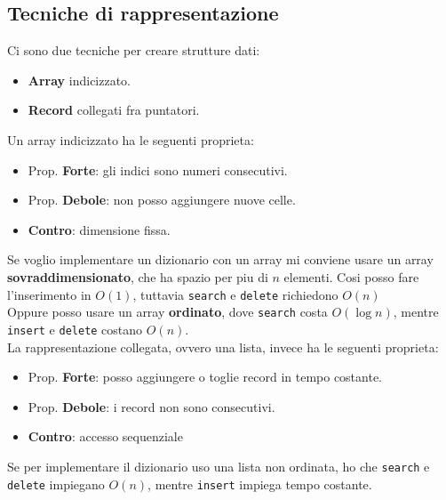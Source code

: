     \subsection{Tecniche di rappresentazione}
        Ci sono due tecniche per creare strutture dati:
        \begin{itemize}
            \item \textbf{Array} indicizzato.
            \item \textbf{Record} collegati fra puntatori.
        \end{itemize} 
        
        Un array indicizzato ha le seguenti proprieta:
        \begin{itemize}
            \item Prop. \textbf{Forte}: gli indici sono numeri consecutivi.
            \item Prop. \textbf{Debole}: non posso aggiungere nuove celle.
            \item \textbf{Contro}: dimensione fissa.
        \end{itemize}

        Se voglio implementare un dizionario con un array mi conviene usare un array \textbf{sovraddimensionato},
        che ha spazio per piu di \(n\) elementi. Cosi posso fare l'inserimento in \(O(1)\), 
        tuttavia \texttt{search} e \texttt{delete} richiedono \(O(n)\) \\

        Oppure posso usare un array \textbf{ordinato}, dove \texttt{search} costa \(O(\log n)\), mentre \texttt{insert} e \texttt{delete}
        costano \(O(n)\). \\

        La rappresentazione collegata, ovvero una lista, invece ha le seguenti proprieta:
        \begin{itemize}
            \item Prop. \textbf{Forte}: posso aggiungere o toglie record in tempo costante.
            \item Prop. \textbf{Debole}: i record non sono consecutivi.
            \item \textbf{Contro}: accesso sequenziale
        \end{itemize}

        Se per implementare il dizionario uso una lista non ordinata, ho che 
        \texttt{search} e \texttt{delete} impiegano \(O(n)\), mentre \texttt{insert} impiega tempo costante.

